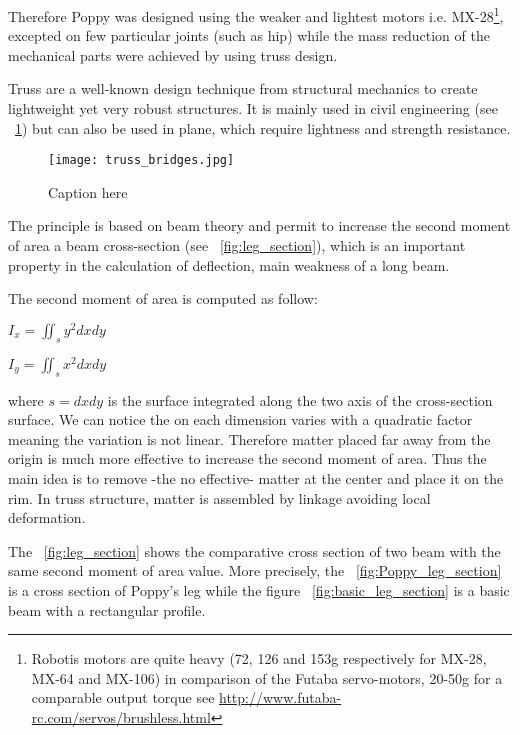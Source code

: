 Therefore Poppy was designed using the weaker and lightest motors i.e. MX-28\footnote{Robotis motors are quite heavy (72, 126 and 153g respectively for MX-28, MX-64 and MX-106) in comparison of the Futaba servo-motors, 20-50g for a comparable output torque see \url{http://www.futaba-rc.com/servos/brushless.html}}, excepted on few particular joints (such as hip) while the mass reduction of the mechanical parts were achieved by using truss design.

Truss are a well-known design technique from structural mechanics to create lightweight yet very robust structures. It is mainly used in civil engineering (see \figurename~\ref{fig:truss_bridges}) but can also be used in plane, which require lightness and strength resistance.

\begin{figure}[tb]
    \begin{center}
        \texttt{[image: truss\_bridges.jpg]}
    \end{center}
    \caption{Caption here}
    \label{fig:truss_bridges}
\end{figure}

The principle is based on beam theory and permit to increase the second moment of area a beam cross-section (see \figurename~\ref{fig:leg_section}), which is an important property in the calculation of deflection, main weakness of a long beam.

The second moment of area is computed as follow:

\begin{center}
    $I_x = \iint_s y^2 dxdy$

    $I_y = \iint_s x^2 dxdy$
\end{center}

where $s = dxdy$ is the surface integrated along the two axis of the cross-section surface. We can notice the  on each dimension varies with a quadratic factor meaning the variation is not linear. Therefore matter placed far away from the origin is much more effective to increase the second moment of area.
Thus the main idea is to remove -the no effective- matter at the center and place it on the rim. In truss structure, matter is assembled by linkage avoiding local deformation.

The \figurename~\ref{fig:leg_section} shows the comparative cross section of two beam with the same second moment of area value. More precisely, the \figurename~\ref{fig:Poppy_leg_section} is a cross section of Poppy's leg while the figure \figurename~\ref{fig:basic_leg_section} is a basic beam with a rectangular profile.


